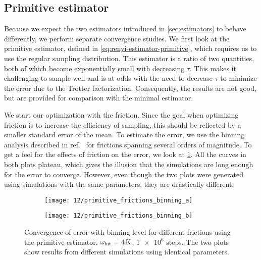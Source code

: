 \subsection{Primitive estimator}

Because we expect the two estimators introduced in \cref{sec:estimators} to behave differently, we perform separate convergence studies.
We first look at the primitive estimator, defined in \vref{eq:renyi-estimator-primitive}, which requires us to use the regular sampling distribution.
This estimator is a ratio of two quantities, both of which become exponentially small with decreasing $\tau$.
This makes it challenging to sample well and is at odds with the need to decrease $\tau$ to minimize the error due to the Trotter factorization.
Consequently, the results are not good, but are provided for comparison with the minimal estimator.

We start our optimization with the friction.
Since the goal when optimizing friction is to increase the efficiency of sampling, this should be reflected by a smaller standard error of the mean.
To estimate the error, we use the binning analysis described in ref.~\cite{ambegaokar2010estimating} for frictions spanning several orders of magnitude.
To get a feel for the effects of friction on the error, we look at \cref{fig:primitive-frictions-binning}.
All the curves in both plots plateau, which gives the illusion that the simulations are long enough for the error to converge.
However, even though the two plots were generated using simulations with the same parameters, they are drastically different.

\begin{figure}
	\setlength{\figspacing}{5 mm}
	\centering
	\begin{subfigure}[b]{\textwidth}
		\texttt{[image: 12/primitive\_frictions\_binning\_a]}
		\caption{}
		\vspace{\figspacing}
	\end{subfigure}
	\begin{subfigure}[b]{\textwidth}
		\texttt{[image: 12/primitive\_frictions\_binning\_b]}
		\caption{}
	\end{subfigure}
	\caption[
		Error convergence for primitive estimator
	]{
		Convergence of error with binning level for different frictions using the primitive estimator.
		$\omega_\text{int} = \SI{4}{\kelvin}$, $\num{1e6}$ steps.
		The two plots show results from different simulations using identical parameters.
	}
	\label{fig:primitive-frictions-binning}
\end{figure}

